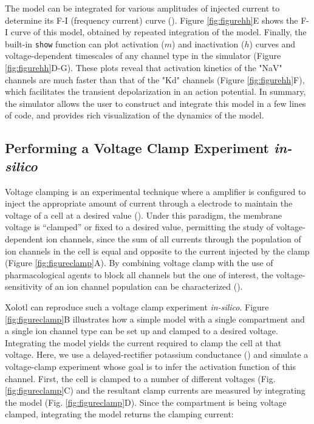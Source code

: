 \documentclass{frontiersSCNS} %
\begin{document}
The model can be integrated for various amplitudes of injected current to determine its F-I (frequency current) curve (\cite{kisperskyIncreaseSodiumConductance2012}). Figure \ref{fig:figurehh}E shows the F-I curve of this model, obtained by repeated integration of the model.  Finally, the built-in \texttt{show} function can plot activation ($m$) and inactivation ($h$) curves and voltage-dependent timescales of any channel type in the simulator (Figure \ref{fig:figurehh}D-G). These plots reveal that activation kinetics of the "NaV" channels are much faster than that of the "Kd" channels (Figure \ref{fig:figurehh}F), which facilitates the transient depolarization in an action potential. In summary, the simulator allows the user to construct and integrate this model in a few lines of code, and provides rich visualization of the dynamics of the model.


%
%
%
%
%
%




\subsection{Performing a Voltage Clamp Experiment \textit{in-silico}}


Voltage clamping is an experimental technique where a amplifier is configured to inject the appropriate amount of current through a electrode to maintain the voltage of a cell at a desired value (\cite{dayanTheoreticalNeuroscience2001}). Under this paradigm, the membrane voltage is ``clamped'' or fixed to a desired value, permitting the study of voltage-dependent ion channels, since the sum of all currents through the population of ion channels in the cell is equal and opposite to the current injected by the clamp (Figure \ref{fig:figureclamp}A). By combining voltage clamp with the use of pharmacological agents to block all channels but the one of interest, the voltage-sensitivity of an ion channel population can be characterized (\cite{coleIonicCurrentMeasurements1960, coleIonsPotentialsNerve1955, hodgkinEffectSodiumIons1949, hodgkinMeasurementCurrentvoltageRelations1952, hodgkinQuantitativeDescriptionMembrane1952, turrigianoSelectiveRegulationCurrent1995}).

Xolotl can reproduce such a voltage clamp experiment \textit{in-silico}. Figure \ref{fig:figureclamp}B illustrates how a simple model with a single compartment and a single ion channel type can be set up and clamped to a desired voltage.  Integrating the model yields the current required to clamp the cell at that voltage. Here, we use a delayed-rectifier potassium conductance (\cite{liuModelNeuronActivityDependent1998}) and simulate a voltage-clamp experiment whose goal is to infer the activation function of this channel. First, the cell is clamped to a number of different voltages (Fig. \ref{fig:figureclamp}C) and the resultant clamp currents are measured by integrating the model (Fig. \ref{fig:figureclamp}D). Since the compartment is being voltage clamped, integrating the model returns the clamping current:
\end{document}

